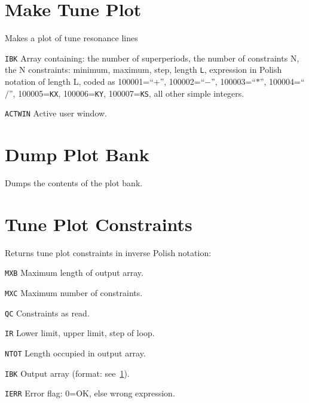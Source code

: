 \section{Make Tune Plot}
\label{PLARWE}
Makes a plot of tune resonance lines
\begin{mylist}
\item[\tt IBK]
Array containing:
the number of superperiods,
the number of constraints N,
the N constraints:
minimum, maximum, step, length {\tt L},
expression in Polish notation of length L,
coded as 100001=``$+$'', 100002=``$-$'', 100003=``$*$'',
100004=``$/$'', 100005={\tt KX}, 100006={\tt KY}, 100007={\tt KS},
all other simple integers. 
\item[\tt ACTWIN]
Active user window.
\end{mylist}

\section{Dump Plot Bank}
\label{PLDUMP}
Dumps the contents of the plot bank.

\section{Tune Plot Constraints}
\label{PLGARW}
Returns tune plot constraints in inverse Polish notation:
\begin{mylist}
\item[\tt MXB]
Maximum length of output array.
\item[\tt MXC]
Maximum number of constraints.
\item[\tt QC]
Constraints as read.
\item[\tt IR]
Lower limit, upper limit, step of loop.
\item[\tt NTOT]
Length occupied in output array.
\item[\tt IBK]
Output array  (format: see~\ref{PLARWE}).
\item[\tt IERR]
Error flag: 0=OK, else wrong expression.
\end{mylist}

